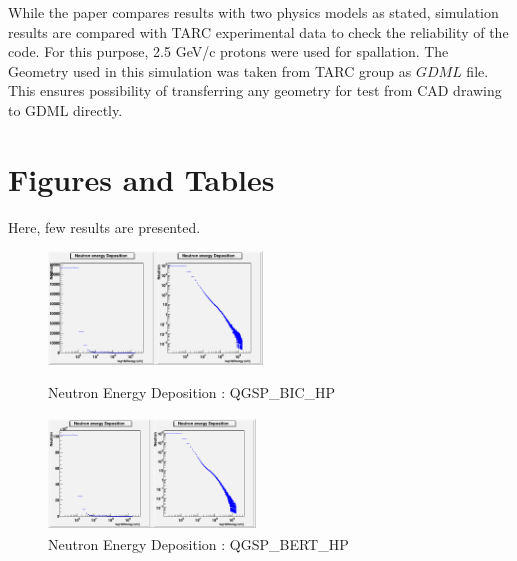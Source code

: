 \documentclass[twocolumn,amsmath,amssymb]{snp}
\begin{document}
While the paper compares results with two physics models as stated, simulation results are compared with TARC experimental data to check the reliability of the code. For this purpose, 2.5 GeV/c protons were used for spallation. The Geometry used in this simulation was taken from TARC group as $GDML$ file. This ensures possibility of transferring any geometry for test from CAD drawing to GDML directly. 


\section*{Figures and Tables}
Here, few results are presented.

\begin{figure}
    \centering 
    \begin{minipage}[b]{0.4\textwidth}
    \includegraphics [height=30mm, width=55 mm] {NeutEdepBIC.png}
    \caption{\small Neutron Energy Deposition : QGSP\_BIC\_HP}
    \end{minipage}
    \begin{minipage}[b]{0.4\textwidth}
    \includegraphics [height=30mm, width=55mm] {NeutEdepBERT.png}
    \caption{\small Neutron Energy Deposition : QGSP\_BERT\_HP}
   \end{minipage}
\end{figure}
\end{document}

